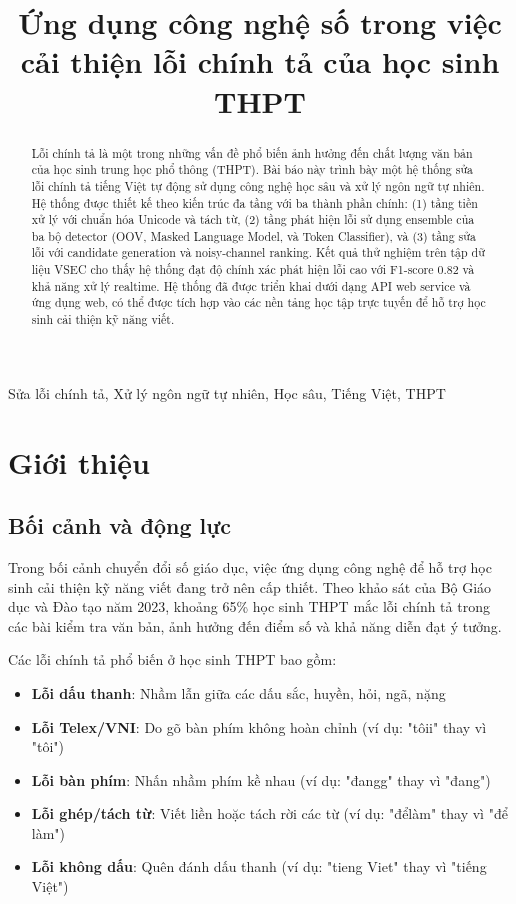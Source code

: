 \documentclass[conference]{IEEEtran}
\title{Ứng dụng công nghệ số trong việc cải thiện lỗi chính tả của học sinh THPT}
\author{\IEEEauthorblockN{Lê Văn Việt, Đoàn Minh Châu}
\IEEEauthorblockA{Khoa Công Nghệ Thông Tin \\
Trường Đại Học Đại Nam \\
}}
\begin{document}
\maketitle

\begin{abstract}
Lỗi chính tả là một trong những vấn đề phổ biến ảnh hưởng đến chất lượng văn bản của học sinh trung học phổ thông (THPT). Bài báo này trình bày một hệ thống sửa lỗi chính tả tiếng Việt tự động sử dụng công nghệ học sâu và xử lý ngôn ngữ tự nhiên. Hệ thống được thiết kế theo kiến trúc đa tầng với ba thành phần chính: (1) tầng tiền xử lý với chuẩn hóa Unicode và tách từ, (2) tầng phát hiện lỗi sử dụng ensemble của ba bộ detector (OOV, Masked Language Model, và Token Classifier), và (3) tầng sửa lỗi với candidate generation và noisy-channel ranking. Kết quả thử nghiệm trên tập dữ liệu VSEC cho thấy hệ thống đạt độ chính xác phát hiện lỗi cao với F1-score 0.82 và khả năng xử lý realtime. Hệ thống đã được triển khai dưới dạng API web service và ứng dụng web, có thể được tích hợp vào các nền tảng học tập trực tuyến để hỗ trợ học sinh cải thiện kỹ năng viết.
\end{abstract}

\begin{IEEEkeywords}
Sửa lỗi chính tả, Xử lý ngôn ngữ tự nhiên, Học sâu, Tiếng Việt, THPT
\end{IEEEkeywords}

\section{Giới thiệu}

\subsection{Bối cảnh và động lực}
Trong bối cảnh chuyển đổi số giáo dục, việc ứng dụng công nghệ để hỗ trợ học sinh cải thiện kỹ năng viết đang trở nên cấp thiết. Theo khảo sát của Bộ Giáo dục và Đào tạo năm 2023, khoảng 65\% học sinh THPT mắc lỗi chính tả trong các bài kiểm tra văn bản, ảnh hưởng đến điểm số và khả năng diễn đạt ý tưởng.

Các lỗi chính tả phổ biến ở học sinh THPT bao gồm:
\begin{itemize}
    \item \textbf{Lỗi dấu thanh}: Nhầm lẫn giữa các dấu sắc, huyền, hỏi, ngã, nặng
    \item \textbf{Lỗi Telex/VNI}: Do gõ bàn phím không hoàn chỉnh (ví dụ: "tôii" thay vì "tôi")
    \item \textbf{Lỗi bàn phím}: Nhấn nhầm phím kề nhau (ví dụ: "đangg" thay vì "đang")
    \item \textbf{Lỗi ghép/tách từ}: Viết liền hoặc tách rời các từ (ví dụ: "đểlàm" thay vì "để làm")
    \item \textbf{Lỗi không dấu}: Quên đánh dấu thanh (ví dụ: "tieng Viet" thay vì "tiếng Việt")
\end{itemize}
\end{document}
